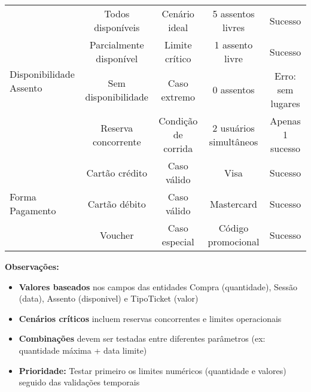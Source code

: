 \documentclass{article}
\begin{document}
\begin{table}[ht]
{\begin{tabular}{|l|c|c|c|c|}
\multirow{4}{*}{Disponibilidade Assento} 
& Todos disponíveis & Cenário ideal & 5 assentos livres & Sucesso \\ \cline{2-5}
& Parcialmente disponível & Limite crítico & 1 assento livre & Sucesso \\ \cline{2-5}
& Sem disponibilidade & Caso extremo & 0 assentos & Erro: sem lugares \\ \cline{2-5}
& Reserva concorrente & Condição de corrida & 2 usuários simultâneos & Apenas 1 sucesso \\ \hline

\multirow{3}{*}{Forma Pagamento} 
& Cartão crédito & Caso válido & Visa & Sucesso \\ \cline{2-5}
& Cartão débito & Caso válido & Mastercard & Sucesso \\ \cline{2-5}
& Voucher & Caso especial & Código promocional & Sucesso \\ \hline

\end{tabular}%
}
\end{table}

\textbf{Observações:}
\begin{itemize}
\item \textbf{Valores baseados} nos campos das entidades Compra (quantidade), Sessão (data), Assento (disponivel) e TipoTicket (valor)
\item \textbf{Cenários críticos} incluem reservas concorrentes e limites operacionais
\item \textbf{Combinações} devem ser testadas entre diferentes parâmetros (ex: quantidade máxima + data limite)
\item \textbf{Prioridade:} Testar primeiro os limites numéricos (quantidade e valores) seguido das validações temporais
\end{itemize}
\end{document}
